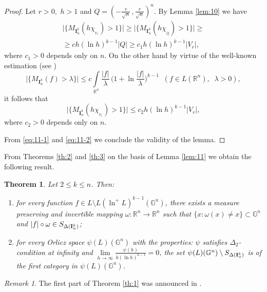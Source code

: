 \documentclass[12pt,reqno]{article}
\newtheorem{theorem}{Theorem}
\theoremstyle{remark}
\newtheorem{remark}{Remark}
\begin{document}
\begin{proof}
Let $r>0,$ $h>1$ and $Q=(-\frac{r}{\sqrt{n}}\,,\frac{r}{\sqrt{n}})^n$. By Lemma \ref{lem:10} we have
\begin{multline}
    \big|\big\{M_{\textbf{I}_n^k}(h\chi_{{}_{V_r}})>1\big\}\big|\geq \big|\big\{M_{\textbf{I}_n^k}(h\chi_{{}_Q})>1\big\}\big|\geq \\
    \geq ch(\ln h)^{k-1}|Q|\geq c_1h(\ln h)^{k-1}|V_r|, \label{eq:11-1}
\end{multline}
where $c_1>0$ depends only on $n$. On the other hand by virtue of the well-known estimation (see \cite[Chapter~II, \S~3]{3})
$$  \big|\big\{M_{\textbf{I}_n^k}(f)>\lambda\big\}\big|\leq
        c\int\limits_{\mathbb{R}^n} \frac{|f|}{\lambda}\,\Big(1+\ln\frac{|f|}{\lambda}\Big)^{k-1} \;\; (f\in L(\mathbb{R}^n), \;\;\lambda>0), $$
it follows that
\begin{equation}\label{eq:11-2}
    \big|\big\{M_{\textbf{I}_n^k}(h\chi_{{}_{V_r}})>1\big\}\big|\leq c_2h(\ln h)^{k-1}|V_r|,
\end{equation}
where $c_2>0$ depends only on $n$.

From \eqref{eq:11-1} and \eqref{eq:11-2} we conclude the validity of the lemma.
\end{proof}

From Theorems \ref{th:2} and \ref{th:3} on the basis of Lemma \ref{lem:11} we obtain the following result.

\begin{theorem}\label{th:4}
Let $2\leq k\leq n$. Then:
\begin{enumerate}
\item[$1)$] for every function $f\in L\setminus L(\ln^{+}L)^{k-1}(\mathbb{G}^n)$, there exists a measure preserving and invertible mapping $\omega:\mathbb{R}^n\to\mathbb{R}^n$ such that  $\{x:\omega(x)\neq x\}\subset \mathbb{G}^n$ and $|f|\circ\omega\in S_{\Delta(\bold{I}_n^k)}$;

\item[$2)$] for every Orlicz space $\psi(L)(\mathbb{G}^n)$ with the properties: $\psi$ satisfies $\Delta_2$-con\-di\-ti\-on at infinity and $\lim\limits_{h\to\infty} \frac{\psi(h)}{h(\ln h)^{k-1}}=0$, the set $\psi(L)(\mathbb{G}^n)\setminus S_{\Delta(\bold{I}_n^k)}$ is of the first category in $\psi(L)(\mathbb{G}^n)$.
\end{enumerate}
\end{theorem}

\begin{remark}\label{rem:3}
The first part of Theorem \ref{th:1} was announced in \cite{11}.
\end{remark}
\end{document}
